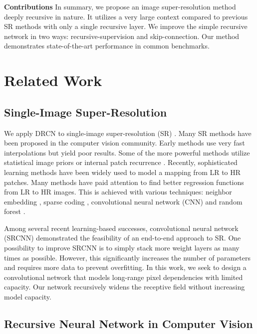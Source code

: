 \documentclass[10pt,twocolumn,letterpaper]{article}
\begin{document}
\textbf{Contributions} In summary, we propose an image super-resolution method deeply recursive in nature. It utilizes a very large context compared to previous SR methods with only a single recursive layer. We improve the simple recursive network in two ways: recursive-supervision and skip-connection. Our method demonstrates state-of-the-art performance in common benchmarks.

\section{Related Work}

\subsection{Single-Image Super-Resolution}

We apply DRCN to single-image super-resolution (SR) \cite{Irani1991, freeman2000learning,glasner2009super}. Many SR methods have been proposed in the computer vision community. Early methods use very fast interpolations but yield poor results. Some of the more powerful methods utilize statistical image priors \cite{sun2008image,Kim2010} or internal patch recurrence \cite{glasner2009super, Huang-CVPR-2015}. Recently, sophisticated learning methods have been widely used to model a mapping from LR to HR patches. Many methods have paid attention to find better regression functions from LR to HR images. This is achieved with various techniques: neighbor embedding \cite{chang2004super,bevilacqua2012}, sparse coding \cite{yang2010image,zeyde2012single,Timofte2013,Timofte}, convolutional neural network (CNN) \cite{dong2014image} and random forest \cite{schulter2015fast}.

Among several recent learning-based successes,  convolutional neural network (SRCNN) \cite{dong2014image} demonstrated the feasibility of an end-to-end approach to SR. One possibility to improve SRCNN is to simply stack more weight layers as many times as possible. However, this significantly increases the number of parameters and requires more data to prevent overfitting. In this work, we seek to design a convolutional network that models long-range pixel dependencies with limited capacity. Our network recursively widens the receptive field without increasing model capacity. 

\subsection{Recursive Neural Network in Computer Vision}
\end{document}
